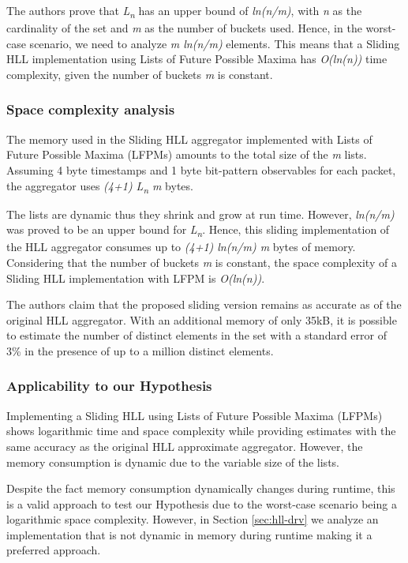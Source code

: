 The authors prove that \textit{L\textsubscript{n}} has an upper bound of \textit{ln(n/m)}, with \textit{n} as the cardinality of the set and \textit{m} as the number of buckets used. Hence, in the worst-case scenario, we need to analyze \textit{m ln(n/m)} elements. This means that a Sliding HLL implementation using Lists of Future Possible Maxima has \textit{O(ln(n))} time complexity, given the number of buckets \textit{m} is constant.

\subsubsection*{Space complexity analysis}
The memory used in the Sliding HLL aggregator implemented with Lists of Future Possible Maxima (LFPMs) amounts to the total size of the \textit{m} lists. Assuming 4 byte timestamps and 1 byte bit-pattern observables for each packet, the aggregator uses \textit{(4+1) L\textsubscript{n} m} bytes. 

The lists are dynamic thus they shrink and grow at run time. However, \textit{ln(n/m)} was proved to be an upper bound for \textit{L\textsubscript{n}}. Hence, this sliding implementation of the HLL aggregator consumes up to \textit{(4+1) ln(n/m) m} bytes of memory. Considering that the number of buckets \textit{m} is constant, the space complexity of a Sliding HLL implementation with LFPM is \textit{O(ln(n))}.

The authors claim that the proposed sliding version remains as accurate as of the original HLL aggregator. With an additional memory of only 35kB, it is possible to estimate the number of distinct elements in the set with a standard error of 3\% in the presence of up to a million distinct elements.

\subsubsection*{Applicability to our Hypothesis}
Implementing a Sliding HLL using Lists of Future Possible Maxima (LFPMs) shows logarithmic time and space complexity while providing estimates with the same accuracy as the original HLL approximate aggregator. However, the memory consumption is dynamic due to the variable size of the lists. 

Despite the fact memory consumption dynamically changes during runtime, this is a valid approach to test our Hypothesis due to the worst-case scenario being a logarithmic space complexity. However, in Section \ref{sec:hll-drv} we analyze an implementation that is not dynamic in memory during runtime making it a preferred approach.


